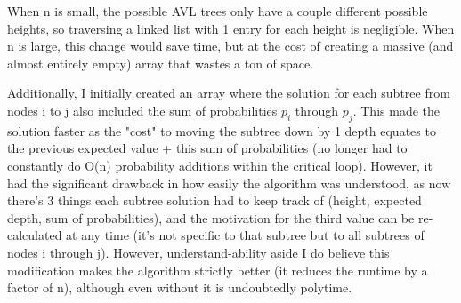 \documentclass[a4paper]{article}
\begin{document}
When n is small, the possible AVL trees only have a couple different possible heights, so traversing a linked list with 1 entry for each height is negligible. When n is large, this change would save time, but at the cost of creating a massive (and almost entirely empty) array that wastes a ton of space.


Additionally, I initially created an array where the solution for each subtree from nodes i to j also included the sum of probabilities $p_i$ through $p_j$. This made the solution faster as the "cost" to moving the subtree down by 1 depth equates to the previous expected value + this sum of probabilities (no longer had to constantly do O(n) probability additions within the critical loop). However, it had the significant drawback in how easily the algorithm was understood, as now there's 3 things each subtree solution had to keep track of (height, expected depth, sum of probabilities), and the motivation for the third value can be re-calculated at any time (it's not specific to that subtree but to all subtrees of nodes i through j). However, understand-ability aside I do believe this modification makes the algorithm strictly better (it reduces the runtime by a factor of n), although even without it is undoubtedly polytime.
\end{document}
